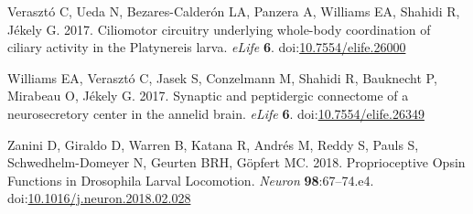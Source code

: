 \documentclass[
  11pt,
]{article}
\newlength{\cslhangindent}
\newenvironment{CSLReferences}[2] %
 {\begin{list}{}{%
  \setlength{\itemindent}{0pt}
  \setlength{\leftmargin}{0pt}
  \setlength{\parsep}{0pt}
  \ifodd #1
   \setlength{\leftmargin}{\cslhangindent}
   \setlength{\itemindent}{-1\cslhangindent}
  \fi
  \setlength{\itemsep}{#2\baselineskip}}}
 {\end{list}}
\begin{document}
\begin{CSLReferences}{1}{0}
Verasztó C, Ueda N, Bezares-Calderón LA, Panzera A, Williams EA, Shahidi
R, Jékely G. 2017. Ciliomotor circuitry underlying whole-body
coordination of ciliary activity in the Platynereis larva. \emph{eLife}
\textbf{6}.
doi:\href{https://doi.org/10.7554/elife.26000}{10.7554/elife.26000}

Williams EA, Verasztó C, Jasek S, Conzelmann M, Shahidi R, Bauknecht P,
Mirabeau O, Jékely G. 2017. Synaptic and peptidergic connectome of a
neurosecretory center in the annelid brain. \emph{eLife} \textbf{6}.
doi:\href{https://doi.org/10.7554/elife.26349}{10.7554/elife.26349}

Zanini D, Giraldo D, Warren B, Katana R, Andrés M, Reddy S, Pauls S,
Schwedhelm-Domeyer N, Geurten BRH, Göpfert MC. 2018. Proprioceptive
Opsin Functions in Drosophila Larval Locomotion. \emph{Neuron}
\textbf{98}:67--74.e4.
doi:\href{https://doi.org/10.1016/j.neuron.2018.02.028}{10.1016/j.neuron.2018.02.028}

\end{CSLReferences}
\end{document}
